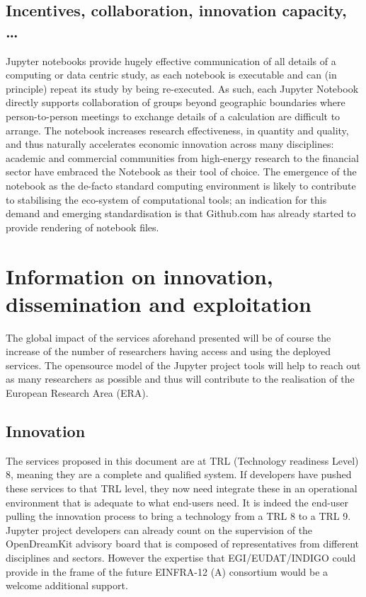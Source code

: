 \subsection{Incentives, collaboration, innovation capacity, \ldots}
Jupyter notebooks provide hugely effective communication of all
details of a computing or data centric study, as each notebook is
executable and can (in principle) repeat its study by being
re-executed. As such, each Jupyter Notebook directly supports
collaboration of groups beyond geographic boundaries where
person-to-person meetings to exchange details of a calculation are
difficult to arrange. The notebook increases research effectiveness,
in quantity and quality, and thus naturally accelerates economic
innovation across many disciplines: academic and commercial
communities from high-energy research to the financial sector have
embraced the Notebook as their tool of choice. The emergence of the
notebook as the de-facto standard computing environment is likely to
contribute to stabilising the eco-system of computational tools; an
indication for this demand and emerging standardisation is that
Github.com has already started to provide rendering of notebook files.




\section{Information on innovation, dissemination and exploitation}

The global impact of the services aforehand presented will be of course the increase of the number of researchers having access and using the deployed services. The opensource model of the Jupyter project tools will help to reach out as many researchers as possible and thus will contribute to the realisation of the European Research Area  (ERA).

\subsection{Innovation}

The services proposed in this document are at TRL (Technology readiness Level) 8, meaning they are a complete and qualified system. If developers have pushed these services to that TRL level, they now need integrate these in an operational environment that is adequate to what end-users need. It is indeed the end-user pulling the innovation process to bring a technology from a TRL 8 to a TRL 9.
Jupyter project developers can already count on the supervision of the OpenDreamKit advisory board that is composed of representatives from different disciplines and sectors. However the expertise that EGI/EUDAT/INDIGO could provide in the frame of the future EINFRA-12 (A) consortium would be a welcome additional support.

